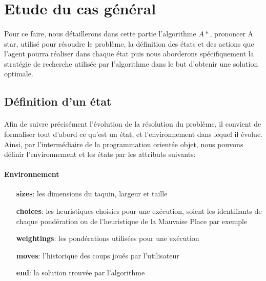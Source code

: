 \documentclass[10pt,a4paper]{report}
\begin{document}
\section{Etude du cas général}

\paragraph{}{Pour ce faire, nous détaillerons dans cette partie l’algorithme ${A*}$, prononcer A star, utilisé pour résoudre le problème, la définition des états et des actions que l’agent pourra réaliser dans chaque état puis nous aborderons spécifiquement la stratégie de recherche utilisée par l’algorithme dans le but d'obtenir une solution optimale.}

\subsection{Définition d’un état}

\paragraph{}{Afin de suivre précisément l’évolution de la résolution du problème, il convient de formaliser tout d’abord ce qu'est un état, et l'environnement dans lequel il évolue. Ainsi, par l'intermédiaire de la programmation orientée objet, nous pouvons définir l'environnement et les états par les attributs suivants:}

\paragraph{Environnement}
\begin{enumerate}
	\item [{\ttfamily\bfseries sizes}:] {les dimensions du taquin, largeur et taille}
	\item [{\ttfamily\bfseries choices}:] {les heuristiques choisies pour une exécution, soient les identifiants de chaque pondération ou de l'heuristique de la Mauvaise Place par exemple}
	\item [{\ttfamily\bfseries weightings}:] {les pondérations utilisées pour une exécution}
	\item [{\ttfamily\bfseries moves}:] {l'historique des coups joués par l'utilisateur}
	\item [{\ttfamily\bfseries end}:] {la solution trouvée par l'algorithme}
\end{enumerate}
\end{document}
